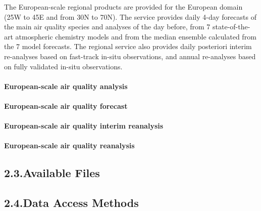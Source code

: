 \documentclass[9pt]{report}
\begin{document}
\noindent{}The European-scale regional products are provided for the European domain (25\textdegree{}W to 45\textdegree{}E and from 30\textdegree{}N to 70\textdegree{}N). 
The service provides daily 4-day forecasts of the main air quality species and analyses of the day before, from 7 state-of-the-art atmospheric chemistry models and from the median ensemble calculated from the 7 model forecasts. 
The regional service also provides daily posteriori interim re-analyses based on fast-track in-situ observations, and annual re-analyses based on fully validated in-situ observations.%

\paragraph{European-scale air quality analysis}\label{sec-european-scale-air-quality-analysis}%

\paragraph{European-scale air quality forecast}\label{sec-european-scale-air-quality-forecast}%

\paragraph{European-scale air quality interim reanalysis}\label{sec-european-scale-air-quality-interim-reanalysis}%

\paragraph{European-scale air quality reanalysis}\label{sec-european-scale-air-quality-reanalysis}%

\subsection{2.3.\hspace*{0.5em}Available Files}\label{sec-available-files}%

\subsection{2.4.\hspace*{0.5em}Data Access Methods}\label{sec-data-access-methods}%
\end{document}
